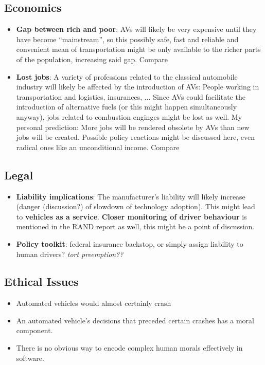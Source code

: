 \documentclass[11pt]{article}
\begin{document}
\subsection{Economics}
\begin{itemize}
\item \textbf{Gap between rich and poor}: AVs will likely be very expensive until they have become ``mainstream'', so this possibly safe, fast and reliable and convenient mean of transportation might be only available to the richer parts of the population, increasing said gap. Compare \cite[p. 39]{Rand:16}
\item \textbf{Lost jobs}: A variety of professions related to the classical automobile industry will likely be affected by the introduction of AVs: People working in transportation and logistics, insurances, ... Since AVs could facilitate the introduction of alternative fuels (or this might happen simultaneously anyway), jobs related to combustion enginges might be lost as well. My personal prediction: More jobs will be rendered obsolete by AVs than new jobs will be created. Possible policy reactions might be discussed here, even radical ones like an unconditional income. Compare \cite[p. 40ff]{Rand:16}
\end{itemize}
\subsection{Legal}
\begin{itemize}
\item \textbf{Liability implications}: The manufacturer's liability will likely increase (danger (discussion?) of slowdown of technology adoption). This might lead to \textbf{vehicles as a service}. \textbf{Closer monitoring of driver behaviour} is mentioned in the RAND report as well, this might be a point of discussion.
\item \textbf{Policy toolkit}: federal insurance backstop, or simply assign liability to human drivers? \textit{tort preemption??}
\end{itemize}

\subsection{Ethical Issues}
\begin{itemize}
\item Automated vehicles would almost certainly crash
\item An automated vehicle's decisions that preceded certain crashes has a moral component. 
\item There is no obvious way to encode complex human morals effectively in software. 
\end{itemize}
\cite{Goodall:14}
\end{document}
